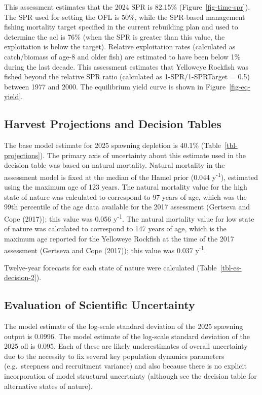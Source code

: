 \documentclass[
]{scrartcl}
\begin{document}
This assessment estimates that the 2024 SPR is 82.15\%
(Figure~\ref{fig-time-spr}). The SPR used for setting the OFL is 50\%,
while the SPR-based management fishing mortality target specified in the
current rebuilding plan and used to determine the \gls{acl} is 76\%
(when the SPR is greater than this value, the exploitation is below the
target). Relative exploitation rates (calculated as catch/biomass of
age-8 and older fish) are estimated to have been below 1\% during the
last decade. This assessment estimates that Yelloweye Rockfish was
fished beyond the relative SPR ratio (calculated as 1-SPR/1-SPRTarget =
0.5) between 1977 and 2000. The equilibrium yield curve is shown in
Figure~\ref{fig-eq-yield}.

\subsection{Harvest Projections and Decision
Tables}\label{harvest-projections-and-decision-tables}

The base model estimate for 2025 spawning depletion is 40.1\%
(Table~\ref{tbl-projections}). The primary axis of uncertainty about
this estimate used in the decision table was based on natural mortality.
Natural mortality in the assessment model is fixed at the median of the
Hamel prior (0.044 y\textsuperscript{-1}), estimated using the maximum
age of 123 years. The natural mortality value for the high state of
nature was calculated to correspond to 97 years of age, which was the
99th percentile of the age data available for the 2017 assessment
(Gertseva and Cope (2017)); this value was 0.056 y\textsuperscript{-1}.
The natural mortality value for low state of nature was calculated to
correspond to 147 years of age, which is the maximum age reported for
the Yelloweye Rockfish at the time of the 2017 assessment (Gertseva and
Cope (2017)); this value was 0.037 y\textsuperscript{-1}.

Twelve-year forecasts for each state of nature were calculated
(Table~\ref{tbl-es-decision-2}).

\subsection{Evaluation of Scientific
Uncertainty}\label{evaluation-of-scientific-uncertainty}

The model estimate of the log-scale standard deviation of the 2025
spawning output is 0.0996. The model estimate of the log-scale standard
deviation of the 2025 \gls{ofl} is 0.095. Each of these are likely
underestimates of overall uncertainty due to the necessity to fix
several key population dynamics parameters (e.g.~steepness and
recruitment variance) and also because there is no explicit
incorporation of model structural uncertainty (although see the decision
table for alternative states of nature).
\end{document}
